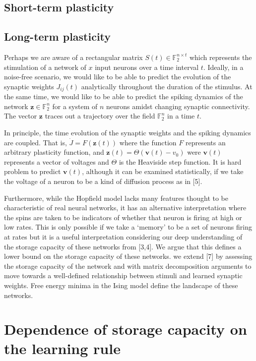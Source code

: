\documentclass{article} %
\begin{document}
\subsection{Short-term plasticity}

\subsection{Long-term plasticity}

Perhaps we are aware of a rectangular matrix $S(t) \in \mathbb{F}_{2}^{n\times t}$ which represents the stimulation of a network of $x$ input neurons over a time interval $t$. Ideally, in a noise-free scenario, we would like to be able to predict the evolution of the synaptic weights $J_{ij}(t)$ analytically throughout the duration of the stimulus. At the same time, we would like to be able to predict the spiking dynamics of the network $\mathbf{z} \in \mathbb{F}_{2}^{n}$ for a system of $n$ neurons amidst changing synaptic connectivity. The vector $\mathbf{z}$ traces out a trajectory over the field $\mathbb{F}_{2}^{n}$ in a time $t$.

In principle, the time evolution of the synaptic weights and the spiking dynamics are coupled. That is, $\dot{J} = F(\mathbf{z}(t))$ where the function $F$ represents an arbitrary plasticity function, and $\mathbf{z}(t) = \Theta(\mathbf{v}(t)-v_{0})$ were $\mathbf{v}(t)$ represents a vector of voltages and $\Theta$ is the Heaviside step function. It is hard problem to predict $\mathbf{v}(t)$, although it can be examined statistically, if we take the voltage of a neuron to be a kind of diffusion process as in [5]. 

Furthermore, while the Hopfield model lacks many features thought to be characteristic of real neural networks, it has an alternative interpretation where the spins are taken to be indicators of whether that neuron is firing at high or low rates. This is only possible if we take a `memory' to be a set of neurons firing at rates but it is a useful interpretation considering our deep understanding of the storage capacity of these networks from [3,4]. We argue that this defines a lower bound on the storage capacity of these networks. we extend [7] by assessing the storage capacity of the network and with matrix decomposition arguments to move towards a well-defined relationship between stimuli and learned synaptic weights. Free energy minima in the Ising model define the landscape of these networks.


\section{Dependence of storage capacity on the learning rule}
\end{document}
